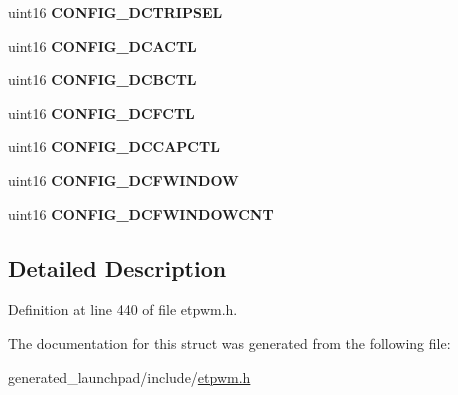 \begin{DoxyCompactItemize}
uint16 {\bfseries C\+O\+N\+F\+I\+G\+\_\+\+D\+C\+T\+R\+I\+P\+S\+EL}
\item 
\mbox{\label{structetpwm__config__reg_a8a4aabce4ca6c9010c49d2d9cd5ab83b}} 
uint16 {\bfseries C\+O\+N\+F\+I\+G\+\_\+\+D\+C\+A\+C\+TL}
\item 
\mbox{\label{structetpwm__config__reg_aa784811520ce79214bd9291431d03c01}} 
uint16 {\bfseries C\+O\+N\+F\+I\+G\+\_\+\+D\+C\+B\+C\+TL}
\item 
\mbox{\label{structetpwm__config__reg_a9d66ec0760a2ce90f3849d95a7547bff}} 
uint16 {\bfseries C\+O\+N\+F\+I\+G\+\_\+\+D\+C\+F\+C\+TL}
\item 
\mbox{\label{structetpwm__config__reg_a45b6b20a7e02985374390d8db5292211}} 
uint16 {\bfseries C\+O\+N\+F\+I\+G\+\_\+\+D\+C\+C\+A\+P\+C\+TL}
\item 
\mbox{\label{structetpwm__config__reg_aad5125106b2d34f16cafe775956a7ef1}} 
uint16 {\bfseries C\+O\+N\+F\+I\+G\+\_\+\+D\+C\+F\+W\+I\+N\+D\+OW}
\item 
\mbox{\label{structetpwm__config__reg_a39b3a7121887ed9ba0b539ef5f62fa53}} 
uint16 {\bfseries C\+O\+N\+F\+I\+G\+\_\+\+D\+C\+F\+W\+I\+N\+D\+O\+W\+C\+NT}
\end{DoxyCompactItemize}


\subsection{Detailed Description}


Definition at line 440 of file etpwm.\+h.



The documentation for this struct was generated from the following file\+:\begin{DoxyCompactItemize}
\item 
generated\+\_\+launchpad/include/\mbox{\hyperlink{etpwm_8h}{etpwm.\+h}}\end{DoxyCompactItemize}
